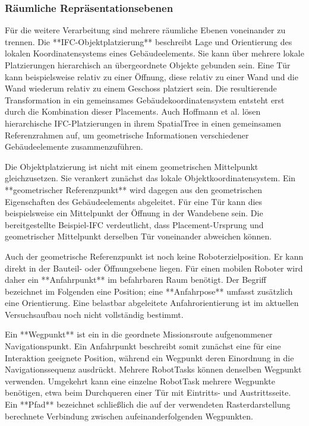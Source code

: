 \subsubsection{Räumliche Repräsentationsebenen}
Für die weitere Verarbeitung sind mehrere räumliche Ebenen voneinander zu trennen. Die
**IFC-Objektplatzierung** beschreibt Lage und Orientierung des lokalen Koordinatensystems eines
Gebäudeelements. Sie kann über mehrere lokale Platzierungen hierarchisch an übergeordnete Objekte
gebunden sein. Eine Tür kann beispielsweise relativ zu einer Öffnung, diese relativ zu einer Wand
und die Wand wiederum relativ zu einem Geschoss platziert sein. Die resultierende Transformation in
ein gemeinsames Gebäudekoordinatensystem entsteht erst durch die Kombination dieser Placements. Auch
Hoffmann et al. lösen hierarchische IFC-Platzierungen in ihrem SpatialTree in einen gemeinsamen
Referenzrahmen auf, um geometrische Informationen verschiedener Gebäudeelemente zusammenzuführen.

Die Objektplatzierung ist nicht mit einem geometrischen Mittelpunkt gleichzusetzen. Sie verankert
zunächst das lokale Objektkoordinatensystem. Ein **geometrischer Referenzpunkt** wird dagegen aus
den geometrischen Eigenschaften des Gebäudeelements abgeleitet. Für eine Tür kann dies
beispielsweise ein Mittelpunkt der Öffnung in der Wandebene sein. Die bereitgestellte Beispiel-IFC
verdeutlicht, dass Placement-Ursprung und geometrischer Mittelpunkt derselben Tür voneinander
abweichen können.

Auch der geometrische Referenzpunkt ist noch keine Roboterzielposition. Er kann direkt in der
Bauteil- oder Öffnungsebene liegen. Für einen mobilen Roboter wird daher ein **Anfahrpunkt** im
befahrbaren Raum benötigt. Der Begriff bezeichnet im Folgenden eine Position; eine **Anfahrpose**
umfasst zusätzlich eine Orientierung. Eine belastbar abgeleitete Anfahrorientierung ist im aktuellen
Versuchsaufbau noch nicht vollständig bestimmt.

Ein **Wegpunkt** ist ein in die geordnete Missionsroute aufgenommener Navigationspunkt. Ein
Anfahrpunkt beschreibt somit zunächst eine für eine Interaktion geeignete Position, während ein
Wegpunkt deren Einordnung in die Navigationssequenz ausdrückt. Mehrere RobotTasks können denselben
Wegpunkt verwenden. Umgekehrt kann eine einzelne RobotTask mehrere Wegpunkte benötigen, etwa beim
Durchqueren einer Tür mit Eintritts- und Austrittsseite. Ein **Pfad** bezeichnet schließlich die auf
der verwendeten Rasterdarstellung berechnete Verbindung zwischen aufeinanderfolgenden Wegpunkten.

